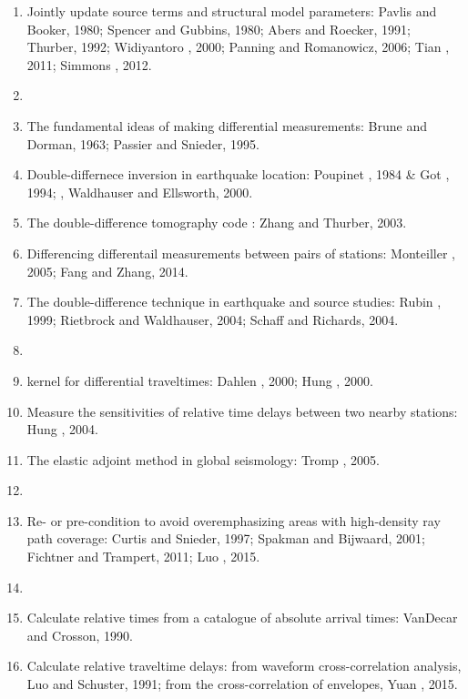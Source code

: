 \begin{enumerate}[\hspace{10mm}*]
  \item Jointly update source terms and structural model parameters:
    Pavlis and Booker, 1980; Spencer and Gubbins, 1980; Abers and Roecker, 1991;
    Thurber, 1992; Widiyantoro \etal, 2000; Panning and Romanowicz, 2006;
    Tian \etal, 2011; Simmons \etal, 2012.
  \item \sline
  \item The fundamental ideas of making differential measurements:
    Brune and Dorman, 1963; Passier and Snieder, 1995.
  \item Double-differnece inversion in earthquake location:
    Poupinet \etal, 1984 \& Got \etal, 1994; 
    ,
    Waldhauser and Ellsworth, 2000.
  \item The double-difference tomography code 
    :
    Zhang and Thurber, 2003.
  \item Differencing differentail measurements between pairs of stations:
    Monteiller \etal, 2005; Fang and Zhang, 2014.
  \item The double-difference technique in earthquake and source studies:
    Rubin \etal, 1999; Rietbrock and Waldhauser, 2004;
    Schaff and Richards, 2004.
  \item \sline
  \item \Frechet kernel for differential traveltimes:
    Dahlen \etal, 2000; Hung \etal, 2000.
  \item Measure the sensitivities of relative time delays between
    two nearby stations: Hung \etal, 2004.
  \item The elastic adjoint method in global seismology: Tromp \etal, 2005.
  \item \sline
  \item Re- or pre-condition to avoid overemphasizing areas with high-density
    ray path coverage: Curtis and Snieder, 1997; Spakman and Bijwaard, 2001;
    Fichtner and Trampert, 2011; Luo \etal, 2015.
  \item \sline
  \item Calculate relative times from a catalogue of absolute arrival times:
    VanDecar and Crosson, 1990.
  \item Calculate relative traveltime delays:
    from waveform cross-correlation analysis, Luo and Schuster, 1991;
    from the cross-correlation of envelopes, Yuan \etal, 2015.

\end{enumerate}
